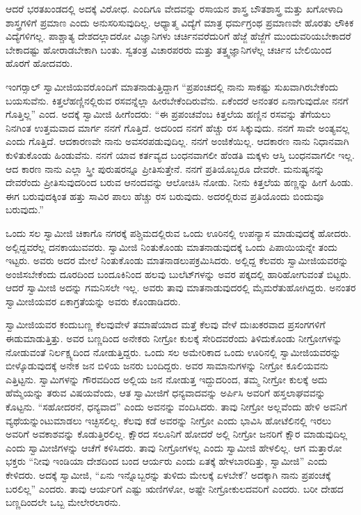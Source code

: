  ಆದರೆ ಭರತಖಂಡದಲ್ಲಿ ಅದಕ್ಕೆ ವಿರೋಧ. ಎಂದಿಗೂ ವೇದವನ್ನು ರಸಾಯನ ಶಾಸ್ತ್ರ ಬೌತಶಾಸ್ತ್ರ ಮತ್ತು ಖಗೋಳಾದಿ ಶಾಸ್ತ್ರಗಳಿಗೆ ಪ್ರಮಾಣ ಎಂದು ಅನುಸರಿಸುವುದಿಲ್ಲ. ಆಧ್ಯಾತ್ಮ ವಿದ್ಯೆಗೆ ಮಾತ್ರ ಧರ್ಮಗ್ರಂಥ ಪ್ರಮಾಣವೇ ಹೊರತು ಲೌಕಿಕ ವಿದ್ಯೆಗಳಿಗಲ್ಲ. ಪಾಶ್ಚಾತ್ಯ ದೇಶದಲ್ಲಾದರೋ ವಿಜ್ಞಾನಿಗಳು ಚರ್ಚಿನವರೆದುರಿಗೆ ಹೆಜ್ಜೆ ಹೆಜ್ಜೆಗೆ ಮುಂದುವರಿಯಬೇಕಾದರೆ ಬೇಕಾದಷ್ಟು ಹೋರಾಡಬೇಕಾಗಿ ಬಂತು. ಸ್ವತಂತ್ರ ವಿಚಾರಪರರು ಮತ್ತು ತತ್ತ್ವಜ್ಞಾನಿಗಳೆಲ್ಲ ಚರ್ಚಿನ ಬೇಲಿಯಿಂದ ಹೊರಗೆ ಹೋದವರು. 

 ಇಂಗರ್‍ಸಾಲ್ ಸ್ವಾಮೀಜಿಯವರೊಂದಿಗೆ ಮಾತನಾಡುತ್ತಿದ್ದಾಗ “ಪ್ರಪಂಚದಲ್ಲಿ ನಾನು ಸಾಕಷ್ಟು ಸುಖವಾಗಿರಬೇಕೆಂದು ಬಯಸುವೆನು. ಕಿತ್ತಲೆಹಣ್ಣಿನಲ್ಲಿರುವ ರಸವನ್ನೆಲ್ಲಾ ಹೀರಬೇಕೆಂದಿರುವೆನು. ಏಕೆಂದರೆ ಅನಂತರ ಏನಾಗುವುದೋ ನನಗೆ ಗೊತ್ತಿಲ್ಲ” ಎಂದ. ಅದಕ್ಕೆ ಸ್ವಾಮೀಜಿ ಹೀಗೆಂದರು: “ಈ ಪ್ರಪಂಚವೆಂಬ ಕಿತ್ತಲೆಯ ಹಣ್ಣಿನ ರಸವನ್ನು ತೆಗೆಯಲು ನಿನಗಿಂತ ಉತ್ತಮವಾದ ಮಾರ್ಗ ನನಗೆ ಗೊತ್ತಿದೆ. ಅದರಿಂದ ನನಗೆ ಹೆಚ್ಚು ರಸ ಸಿಕ್ಕುವುದು. ನನಗೆ ಸಾವೇ ಅಂತ್ಯವಲ್ಲ ಎಂದು ಗೊತ್ತಿದೆ. ಆದಕಾರಣವೇ ನಾನು ಅವಸರಪಡುವುದಿಲ್ಲ. ನನಗೆ ಅಂಜಿಕೆಯಿಲ್ಲ. ಆದಕಾರಣ ನಾನು ನಿಧಾನವಾಗಿ ಕುಳಿತುಕೊಂಡು ಹಿಂಡುವೆನು. ನನಗೆ ಯಾವ ಕರ್ತವ್ಯದ ಬಂಧನವಾಗಲೀ ಹೆಂಡತಿ ಮಕ್ಕಳು ಆಸ್ತಿ ಬಂಧನವಾಗಲೀ ಇಲ್ಲ. ಆದ ಕಾರಣ ನಾನು ಎಲ್ಲಾ ಸ್ತ್ರೀ ಪುರುಷರನ್ನೂ ಪ್ರೀತಿಸುತ್ತೇನೆ. ನನಗೆ ಪ್ರತಿಯೊಬ್ಬರೂ ದೇವರೇ. ಮನುಷ್ಯನನ್ನು ದೇವರೆಂದು ಪ್ರೀತಿಸುವುದರಿಂದ ಬರುವ ಆನಂದವನ್ನು ಆಲೋಚಿಸಿ ನೋಡು. ನೀನು ಕಿತ್ತಲೆಯ ಹಣ್ಣನ್ನು ಹೀಗೆ ಹಿಂಡು. ಈಗ ಬರುವುದಕ್ಕಿಂತ ಹತ್ತು ಸಾವಿರ ಪಾಲು ಹೆಚ್ಚು ರಸ ಬರುವುದು. ಅದರಲ್ಲಿರುವ ಪ್ರತಿಯೊಂದು ಬಿಂದುವೂ ಬರುವುದು.” 

 ಒಂದು ಸಲ ಸ್ವಾಮೀಜಿ ಚಿಕಾಗೊ ನಗರಕ್ಕೆ ಪಶ್ಚಿಮದಲ್ಲಿರುವ ಒಂದು ಊರಿನಲ್ಲಿ ಉಪನ್ಯಾಸ ಮಾಡುವುದಕ್ಕೆ ಹೋದರು. ಅಲ್ಲಿದ್ದವರೆಲ್ಲ ದನಕಾಯುವವರು. ಸ್ವಾಮೀಜಿ ನಿಂತುಕೊಂಡು ಮಾತನಾಡುವುದಕ್ಕೆ ಒಂದು ಪಿಪಾಯಿಯನ್ನೇ ತಂದು ಇಟ್ಟರು. ಅವರು ಅದರ ಮೇಲೆ ನಿಂತುಕೊಂಡು ಮಾತನಾಡಲುಪಕ್ರಮಿಸಿದರು. ಅಲ್ಲಿದ್ದ ಕೆಲವರು ಸ್ವಾಮೀಜಿಯವರನ್ನು ಅಂಜಿಸಬೇಕೆಂದು ದೂರದಿಂದ ಬಂದೂಕಿನಿಂದ ಹಲವು ಬುಲೆಟ್‍ಗಳನ್ನು ಅವರ ಪಕ್ಕದಲ್ಲಿ ಹಾರಿಹೋಗುವಂತೆ ಬಿಟ್ಟರು. ಆದರೆ ಸ್ವಾಮೀಜಿ ಅದನ್ನು ಗಮನಿಸಲೇ ಇಲ್ಲ. ಅವರು ತಾವು ಮಾತನಾಡುವುದರಲ್ಲಿ ಮೈಮರೆತುಹೋಗಿದ್ದರು. ಅನಂತರ ಸ್ವಾಮೀಜಿಯವರ ಏಕಾಗ್ರತೆಯನ್ನು ಅವರು ಕೊಂಡಾಡಿದರು. 

 ಸ್ವಾಮೀಜಿಯವರ ಕಂದುಬಣ್ಣ ಕೆಲವುವೇಳೆ ತಮಾಷೆಯಾದ ಮತ್ತೆ ಕೆಲವು ವೇಳೆ ದುಃಖಕರವಾದ ಪ್ರಸಂಗಗಳಿಗೆ ಈಡುಮಾಡುತ್ತಿತ್ತು. ಅವರ ಬಣ್ಣದಿಂದ ಅನೇಕರು ನೀಗ್ರೋ ಕುಲಕ್ಕೆ ಸೇರಿದವರೆಂದು ತಿಳಿದುಕೊಂಡು ನೀಗ್ರೋಗಳನ್ನು ನೋಡುವಂತೆ ನಿರ್ಲಕ್ಷ್ಯದಿಂದ ನೋಡುತ್ತಿದ್ದರು. ಒಂದು ಸಲ ಅಮೇರಿಕಾದ ಒಂದು ಊರಿನಲ್ಲಿ ಸ್ವಾಮೀಜಿಯವರನ್ನು ಬೀಳ್ಕೊಡುವುದಕ್ಕೆ ಅನೇಕ ಜನ ಬಿಳಿಯ ಜನರು ಬಂದಿದ್ದರು. ಅವರ ಸಾಮಾನುಗಳನ್ನು ನೀಗ್ರೋ ಕೂಲಿಯವನು ಎತ್ತಿಟ್ಟನು. ಸ್ವಾಮಿಗಳನ್ನು ಗೌರವದಿಂದ ಅಲ್ಲಿಯ ಜನ ನೋಡುತ್ತ ಇದ್ದುದರಿಂದ, ತಮ್ಮ ನೀಗ್ರೋ ಕುಲಕ್ಕೆ ಅದು ಹೆಮ್ಮೆಯನ್ನು ತರುವ ವಿಷಯವೆಂದು, ಆತ ಸ್ವಾಮೀಜಿಗೆ ಧನ್ಯವಾದವನ್ನು ಅರ್ಪಿಸಿ ಅವರಿಗೆ ಹಸ್ತಲಾಘವವನ್ನು ಕೊಟ್ಟನು. “ಸಹೋದರನೆ, ಧನ್ಯವಾದ” ಎಂದು ಅವನನ್ನು ವಂದಿಸಿದರು. ತಾವು ನೀಗ್ರೋ ಅಲ್ಲವೆಂದು ಹೇಳಿ ಅವನಿಗೆ ವ್ಯಥೆಯನ್ನುಂಟುಮಾಡಲು ಇಚ್ಛಿಸಲಿಲ್ಲ. ಕೆಲವು ಕಡೆ ಅವರನ್ನು ನೀಗ್ರೋ ಎಂದು ಭಾವಿಸಿ ಹೋಟೆಲಿನಲ್ಲಿ ಇರಲು ಅವರಿಗೆ ಅವಕಾಶವನ್ನು ಕೊಡುತ್ತಿರಲಿಲ್ಲ. ಕ್ಷೌರದ ಸಲೂನಿಗೆ ಹೋದರೆ ಅಲ್ಲಿ ನೀಗ್ರೋ‌ ಜನರಿಗೆ ಕ್ಷೌರ ಮಾಡುವುದಿಲ್ಲ ಎಂದು ಸ್ವಾಮೀಜಿಗಳನ್ನು ಆಚೆಗೆ ಕಳಿಸಿದರು. ತಾವು ನೀಗ್ರೋಗಳಲ್ಲ ಎಂದು ಸ್ವಾಮೀಜಿ ಹೇಳಲಿಲ್ಲ. ಆಗ ಮತ್ತಾರೋ ಭಕ್ತರು “ನೀವು ಇಂಡಿಯಾ ದೇಶದಿಂದ ಬಂದ ಆರ್ಯರು ಎಂದು ಏತಕ್ಕೆ ಹೇಳಬಾರದಿತ್ತು, ಸ್ವಾಮೀಜಿ” ಎಂದು ಕೇಳಿದರು. ಅದಕ್ಕೆ ಸ್ವಾಮೀಜಿ,‌‌ “ಏನು ಇನ್ನೊಬ್ಬರನ್ನು ತುಳಿದು ಮೇಲಕ್ಕೆ ಏಳಬೇಕೆ? ಅದಕ್ಕಾಗಿ ನಾನು ಪ್ರಪಂಚಕ್ಕೆ ಬರಲಿಲ್ಲ‌” ಎಂದರು. ತಾವು ಆರ್ಯರಿಗೆ ಎಷ್ಟು ಋಣಿಗಳೋ, ಅಷ್ಟೇ ನೀಗ್ರೋಕುಲದವರಿಗೆ ಎಂದರು. ಬರೀ ದೇಹದ ಬಣ್ಣದಿಂದಲೇ ಒಬ್ಬ ಮೇಲೇರಲಾರನು. 

